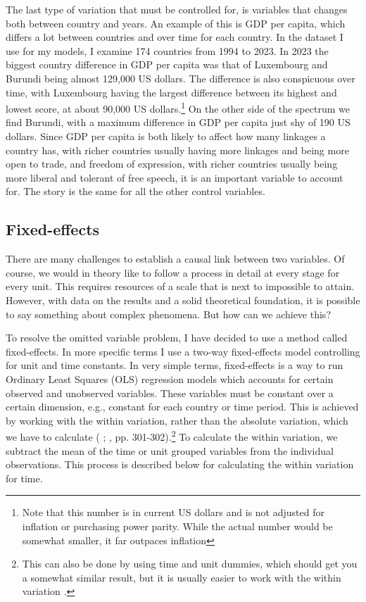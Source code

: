 The last type of variation that must be controlled for, is variables that changes both between country and years. An example of this is GDP per capita, which differs a lot between countries and over time for each country. In the dataset I use for my models, I examine 174 countries from 1994 to 2023. In 2023 the biggest country difference in GDP per capita was that of Luxembourg and Burundi being almost 129,000 US dollars. The difference is also conspicuous over time, with Luxembourg having the largest difference between its highest and lowest score, at about 90,000 US dollars.\footnote{Note that this number is in current US dollars and is not adjusted for inflation or purchasing power parity. While the actual number would be somewhat smaller, it far outpaces inflation} On the other side of the spectrum we find Burundi, with a maximum difference in GDP per capita just shy of 190 US dollars. Since GDP per capita is both likely to affect how many linkages a country has, with richer countries usually having more linkages and being more open to trade, and freedom of expression, with richer countries usually being more liberal and tolerant of free speech, it is an important variable to account for. The story is the same for all the other control variables.

\subsection{Fixed-effects}
There are many challenges to establish a causal link between two variables. Of course, we would in theory like to follow a process in detail at every stage for every unit. This requires resources of a scale that is next to impossible to attain. However, with data on the results and a solid theoretical foundation, it is possible to say something about complex phenomena. But how can we achieve this?

To resolve the omitted variable problem, I have decided to use a method called fixed-effects. In more specific terms I use a two-way fixed-effects model controlling for unit and time constants. In very simple terms, fixed-effects is a way to run Ordinary Least Squares (OLS) regression models which accounts for certain observed and unobserved variables. These variables must be constant over a certain dimension, e.g., constant for each country or time period. This is achieved by working with the within variation, rather than the absolute variation, which we have to calculate (\citeauthor{huntington-klein_effect_2022} \citeyear{huntington-klein_effect_2022}; \citeauthor{wooldridge_econometric_2010} \citeyear{wooldridge_econometric_2010}, pp. 301-302).\footnote{This can also be done by using time and unit dummies, which should get you a somewhat similar result, but it is usually easier to work with the within variation \citep{huntington-klein_effect_2022}.} To calculate the within variation, we subtract the mean of the time or unit grouped variables from the individual observations. This process is described below for calculating the within variation for time. 


